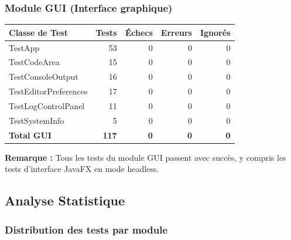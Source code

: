 \subsubsection{Module GUI (Interface graphique)}

\begin{center}
\small
\begin{tabular}{|l|r|r|r|r|}
\hline
\rowcolor{headerblue!20}
\textbf{Classe de Test} & \textbf{Tests} & \textbf{Échecs} & \textbf{Erreurs} & \textbf{Ignorés} \\
\hline
TestApp & 53 & 0 & 0 & 0 \\
\hline
TestCodeArea & 15 & 0 & 0 & 0 \\
\hline
TestConsoleOutput & 16 & 0 & 0 & 0 \\
\hline
TestEditorPreferences & 17 & 0 & 0 & 0 \\
\hline
\rowcolor{successgreen!20}
TestLogControlPanel & 11 & 0 & 0 & 0 \\
\hline
TestSystemInfo & 5 & 0 & 0 & 0 \\
\hline
\rowcolor{gray!10}
\textbf{Total GUI} & \textbf{117} & \textbf{0} & \textbf{0} & \textbf{0} \\
\hline
\end{tabular}
\end{center}

\vspace{0.3cm}
\textbf{Remarque :} Tous les tests du module GUI passent avec succès, y compris les tests d'interface JavaFX en mode headless.

\subsection{Analyse Statistique}

\subsubsection{Distribution des tests par module}

\begin{center}
\end{center}

